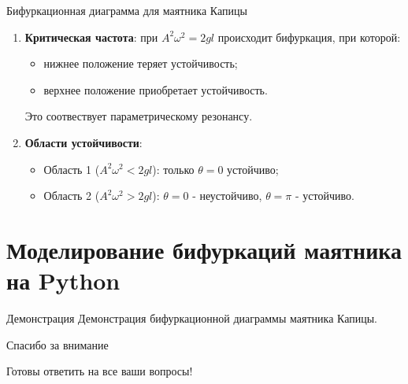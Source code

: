 \documentclass{beamer}
\begin{document}
\begin{frame}{Бифуркационная диаграмма для маятника Капицы}
    \begin{enumerate}
        \item \textbf{Критическая частота}: при $A^2\omega^2=2gl$ происходит бифуркация, при которой:
        \begin{itemize}
            \item нижнее положение теряет устойчивость;
            \item верхнее положение приобретает устойчивость.
        \end{itemize}
        Это соотвествует параметрическому резонансу.
        \item \textbf{Области устойчивости}:
        \begin{itemize}
            \item Область 1 ($A^2\omega^2<2gl$): только $\theta=0$ устойчиво;
            \item Область 2 ($A^2\omega^2>2gl$): $\theta=0$ - неустойчиво, $\theta=\pi$ - устойчиво.
        \end{itemize}
    \end{enumerate}
\end{frame}

\section{Моделирование бифуркаций маятника на Python}
\begin{frame}{Демонстрация}
    Демонстрация бифуркационной диаграммы маятника Капицы.
\end{frame}

\begin{frame}{Спасибо за внимание}
    \begin{center}
        Готовы ответить на все ваши вопросы!
    \end{center}
\end{frame}
\end{document}
